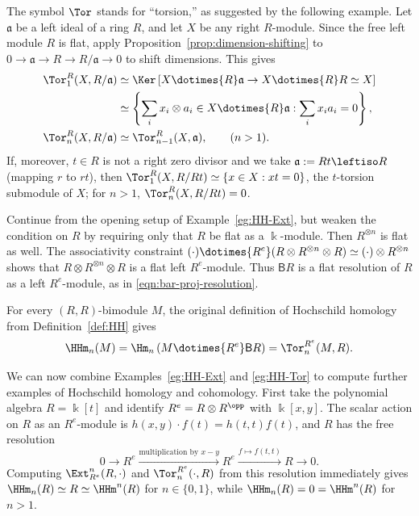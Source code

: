 \begin{remark}
The symbol $\Tor$ stands for “torsion,” as suggested by the following
example. Let $\mathfrak{a}$ be a left ideal of a ring $R$, and let $X$ be any
right $R$-module. Since the free left module $R$ is flat, apply
Proposition~\ref{prop:dimension-shifting} to
$0\to\mathfrak{a}\to R\to R/\mathfrak{a}\to0$ to shift dimensions. This
gives
\begin{align*}
\Tor^R_1(X,R/\mathfrak{a}) &\simeq \Ker\left[
X\dotimes{R}\mathfrak{a}\to X\dotimes{R}R\simeq X\right]\\
&\simeq \left\{\sum_i x_i\otimes a_i\in X\dotimes{R}\mathfrak{a}:
\sum_i x_i a_i=0\right\},\\
\Tor^R_n(X,R/\mathfrak{a})&\simeq\Tor^R_{n-1}(X,\mathfrak{a}),\qquad(n>1).
\end{align*}
If, moreover, $t\in R$ is not a right zero divisor and we take
$\mathfrak{a}:=Rt\leftiso R$ (mapping $r$ to $rt$), then
$\Tor^R_1(X,R/Rt)\simeq\{x\in X:xt=0\}$, the $t$-torsion submodule of $X$;
for $n>1$, $\Tor^R_n(X,R/Rt)=0$.
\end{remark}

\begin{example}\label{eg:HH-Tor}
Continue from the opening setup of Example~\ref{eg:HH-Ext}, but weaken the
condition on $R$ by requiring only that $R$ be flat as a $\Bbbk$-module.
Then $R^{\otimes n}$ is flat as well. The associativity constraint
$(\cdot)\dotimes{R^e}(R\otimes R^{\otimes n}\otimes R)\simeq
(\cdot)\otimes R^{\otimes n}$ shows that
$R\otimes R^{\otimes n}\otimes R$ is a flat left $R^e$-module. Thus
$\mathsf{B}R$ is a flat resolution of $R$ as a left $R^e$-module, as in
\eqref{eqn:bar-proj-resolution}.

For every $(R,R)$-bimodule $M$, the original definition of Hochschild
homology from Definition~\ref{def:HH} gives
\[
\HHm_n(M)=\Hm_n\left(M\dotimes{R^e}\mathsf{B}R\right)
=\Tor_n^{R^e}(M,R).
\]
\end{example}

We can now combine Examples~\ref{eg:HH-Ext} and \ref{eg:HH-Tor} to compute
further examples of Hochschild homology and cohomology. First take the
polynomial algebra $R=\Bbbk[t]$ and identify
$R^e=R\otimes R^{\opp}$ with $\Bbbk[x,y]$. The scalar action on $R$ as an
$R^e$-module is $h(x,y)\cdot f(t)=h(t,t)f(t)$, and $R$ has the free
resolution
\[
0\to R^e\xrightarrow{\text{multiplication by }x-y}R^e
\xrightarrow{f\mapsto f(t,t)}R\to0.
\]
Computing $\Ext^n_{R^e}(R,\cdot)$ and $\Tor_n^{R^e}(\cdot,R)$ from this
resolution immediately gives $\HHm_n(R)\simeq R\simeq\HHm^n(R)$ for
$n\in\{0,1\}$, while $\HHm_n(R)=0=\HHm^n(R)$ for $n>1$.

